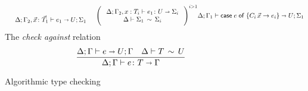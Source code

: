 \begin{figure}[h!]
\begin{gather*}
{              \quad
              \begin{array}{c}\\
                \algtypeout[\kindEnv;\varEnv_2, \vec x\colon\vec T_1]{e_1}{U}{\Sigma_1}
              \end{array}
              \quad
              \Bigg(\;\begin{array}{c}
                        \algtypein[\kindEnv;\varEnv_2,x:T_i]{e_1}{U}{\Sigma_i}\\
                        \ctxequiv{\Sigma_1}{\Sigma_i} 
                      \end{array}
                      \;\Bigg)^{i>1}
                    }{
                      \algtypeout[\kindEnv;\varEnv_1]{\casee{e}{\{C_i\,\vec x\rightarrow e_i\}}}{U}{\Sigma_1}
                    }
                  \end{gather*}
                  The \emph{check against} relation\hfill{}
                  \begin{gather*}
                    \frac{
                      \algtypeout e U \varEnv
                      \quad
                      \typeequiv T U
                    }{
                      \algtypein e T \varEnv
                    }
                  \end{gather*}
                  \caption{Algorithmic type checking}
                  \label{fig:alg-typing}
                \end{figure}

